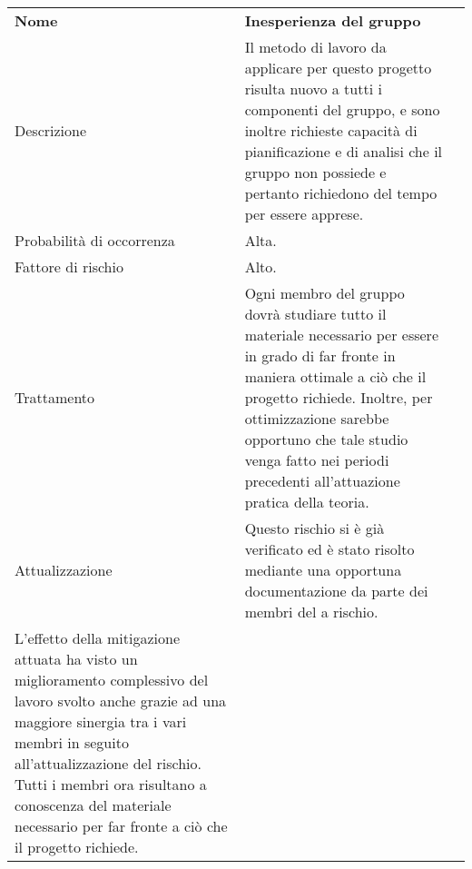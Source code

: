 \begin{center}

	\begin{tabular}{>{\centering\color{white}}m{4cm} >{\centering\color{white}}m{8cm} >{\centering\arraybackslash}m{0pt}@{}}
	\rowcolor{darkblue} \textbf{Nome} & \textbf{Inesperienza del gruppo} & \\[1ex]
	\rowcolor{blue} Descrizione & Il metodo di lavoro da applicare per questo progetto risulta nuovo a tutti i componenti del gruppo, e sono inoltre richieste capacità di pianificazione e di analisi che il gruppo non possiede e pertanto richiedono del tempo per essere apprese. & \\[2ex]	
	\rowcolor{lightblue} Probabilità di occorrenza & Alta. &\\[1ex]
	\rowcolor{blue}  Fattore di rischio & Alto. & \\[1ex]
	\rowcolor{lightblue} Trattamento & Ogni membro del gruppo dovrà studiare tutto il materiale necessario per essere in grado di far fronte in maniera ottimale a ciò che il progetto richiede. Inoltre, per ottimizzazione sarebbe opportuno che tale studio venga fatto nei periodi precedenti all'attuazione pratica della teoria. & \\[1ex] 
	\rowcolor{blue}  Attualizzazione & Questo rischio si è già verificato ed è stato risolto mediante una opportuna documentazione da parte dei membri del \termine{team} a rischio.\\ L'effetto della mitigazione attuata ha visto un miglioramento complessivo del lavoro svolto anche grazie ad una maggiore sinergia tra i vari membri in seguito all'attualizzazione del rischio. Tutti i membri ora risultano a conoscenza del materiale necessario per far fronte a ciò che il progetto richiede. & \\[1ex]
	\end{tabular}

\end{center}

